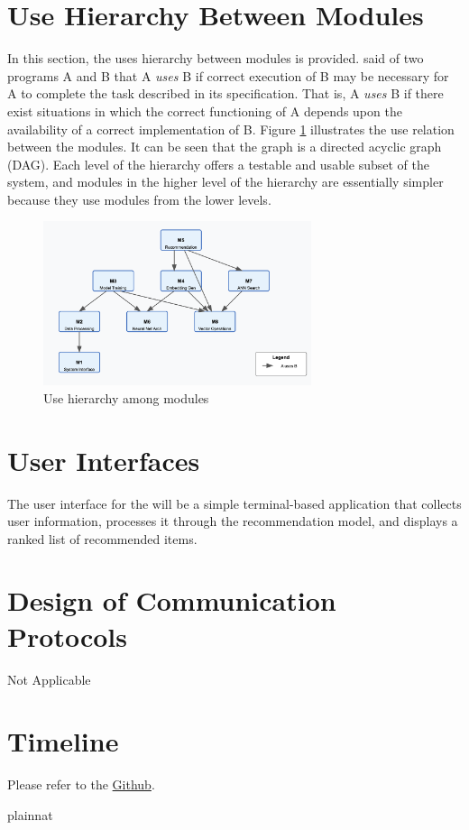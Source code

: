 \documentclass[12pt, titlepage]{article}
\begin{document}
\section{Use Hierarchy Between Modules} \label{SecUse}

In this section, the uses hierarchy between modules is
provided. \citet{Parnas1978} said of two programs A and B that A {\em uses} B if
correct execution of B may be necessary for A to complete the task described in
its specification. That is, A {\em uses} B if there exist situations in which
the correct functioning of A depends upon the availability of a correct
implementation of B.  Figure \ref{FigUH} illustrates the use relation between
the modules. It can be seen that the graph is a directed acyclic graph
(DAG). Each level of the hierarchy offers a testable and usable subset of the
system, and modules in the higher level of the hierarchy are essentially simpler
because they use modules from the lower levels.

\begin{figure}[H]
\centering
\includegraphics[width=0.7\textwidth]{UsesHierarchy.png}
\caption{Use hierarchy among modules}
\label{FigUH}
\end{figure}


\section{User Interfaces}
The user interface for the \progname will be a simple terminal-based application that collects user information, processes it through the recommendation model, and displays a ranked list of recommended items.

\section{Design of Communication Protocols}

Not Applicable

\section{Timeline}

Please refer to the \hyperref{https://github.com/V-AS/Two-tower-recommender-system/tree/main}{}{}{Github}.

 {plainnat}


\newpage{}
\end{document}
